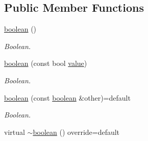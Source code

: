 \subsection*{Public Member Functions}
\begin{DoxyCompactItemize}
\item 
\hyperlink{classformat_1_1boolean_a7dd40c3ccee50e87df9bfadfe450ea14}{boolean} ()\hypertarget{classformat_1_1boolean_a7dd40c3ccee50e87df9bfadfe450ea14}{}\label{classformat_1_1boolean_a7dd40c3ccee50e87df9bfadfe450ea14}

\begin{DoxyCompactList}\small\item\em Boolean. \end{DoxyCompactList}\item 
\hyperlink{classformat_1_1boolean_a11ab54785dc8b08f9920b9bb9de0a346}{boolean} (const bool \hyperlink{classformat_1_1value_aa6b85823936bf7b8ab78d3f8d443c00d}{value})
\begin{DoxyCompactList}\small\item\em Boolean. \end{DoxyCompactList}\item 
\hyperlink{classformat_1_1boolean_aa1d20e80f24d862624e55dd4c5a99844}{boolean} (const \hyperlink{classformat_1_1boolean}{boolean} \&other)=default
\begin{DoxyCompactList}\small\item\em Boolean. \end{DoxyCompactList}\item 
virtual \hyperlink{classformat_1_1boolean_abbfeccbfc4d740e4cfc3667d324fbbc7}{$\sim$boolean} () override=default\hypertarget{classformat_1_1boolean_abbfeccbfc4d740e4cfc3667d324fbbc7}{}\label{classformat_1_1boolean_abbfeccbfc4d740e4cfc3667d324fbbc7}


\end{DoxyCompactItemize}
